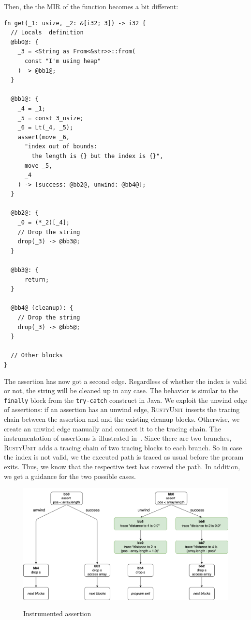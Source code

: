 \documentclass[paper=a4,%
  twoside,%
  BCOR4mm,%
  abstract=true,%
  toc=bibliography,%
  chapterprefix=true,%
  toc=bibliographynumbered,%
  open=right,%
  english,%
  pagesize=pdftex]{scrreprt}
\newcommand{\tech}{\textsc{RustyUnit}\xspace}
\newcommand{\mir}{\ac{MIR}\xspace}
\begin{document}
Then, the the \mir of the function becomes a bit different:
\begin{lstlisting}[language={MIR}, style=boxed, caption={}, label=lst:mir-boundary-check-with-unwinding]
fn get(_1: usize, _2: &[i32; 3]) -> i32 {
  // Locals  definition
  @bb0@: {
    _3 = <String as From<&str>>::from(
      const "I'm using heap"
    ) -> @bb1@;
  }

  @bb1@: {
    _4 = _1;
    _5 = const 3_usize;
    _6 = Lt(_4, _5);
    assert(move _6,
      "index out of bounds:
        the length is {} but the index is {}",
      move _5,
      _4
    ) -> [success: @bb2@, unwind: @bb4@];
  }

  @bb2@: {
    _0 = (*_2)[_4];
    // Drop the string
    drop(_3) -> @bb3@;
  }

  @bb3@: {
      return;
  }

  @bb4@ (cleanup): {
    // Drop the string
    drop(_3) -> @bb5@; 
  }

  // Other blocks
}
\end{lstlisting}

The assertion has now got a second edge. Regardless of whether the index is valid or not, the string will be cleaned up in any case. The behavior is similar to the \texttt{finally} block from the \texttt{try-catch} construct in Java. We exploit the unwind edge of assertions: if an assertion has an unwind edge, \tech inserts the tracing chain between the assertion and and the existing cleanup blocks. Otherwise, we create an unwind edge manually and connect it to the tracing chain. The instrumentation of assertions is illustrated in~. Since there are two branches, \tech adds a tracing chain of two tracing blocks to each branch. So in case the index is not valid, we the executed path is traced as usual before the proram exits. Thus, we know that the respective test has covered the path. In addition, we get a guidance for the two possible cases.

\begin{figure}[h]
\caption{Instrumented assertion}
\centering
\includegraphics[width=\textwidth]{comparison-instrumented-assertion}
\label{fig:comparison-instrumented-assertion}
\end{figure}
\end{document}
